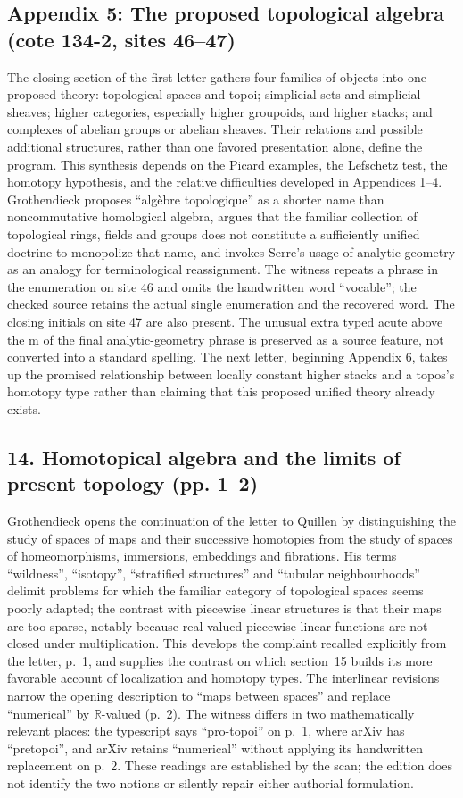 \documentclass[10pt,oneside]{book}
\begin{document}
\subsection*{Appendix 5: The proposed topological algebra (cote 134-2, sites 46--47)}
The closing section of the first letter gathers four families of objects into one proposed theory: topological spaces and topoi; simplicial sets and simplicial sheaves; higher categories, especially higher groupoids, and higher stacks; and complexes of abelian groups or abelian sheaves. Their relations and possible additional structures, rather than one favored presentation alone, define the program. This synthesis depends on the Picard examples, the Lefschetz test, the homotopy hypothesis, and the relative difficulties developed in Appendices 1--4. Grothendieck proposes ``algèbre topologique'' as a shorter name than noncommutative homological algebra, argues that the familiar collection of topological rings, fields and groups does not constitute a sufficiently unified doctrine to monopolize that name, and invokes Serre's usage of analytic geometry as an analogy for terminological reassignment. The witness repeats a phrase in the enumeration on site 46 and omits the handwritten word ``vocable''; the checked source retains the actual single enumeration and the recovered word. The closing initials on site 47 are also present. The unusual extra typed acute above the m of the final analytic-geometry phrase is preserved as a source feature, not converted into a standard spelling. The next letter, beginning Appendix 6, takes up the promised relationship between locally constant higher stacks and a topos's homotopy type rather than claiming that this proposed unified theory already exists.

\subsection*{14. Homotopical algebra and the limits of present topology (pp. 1--2)}
Grothendieck opens the continuation of the letter to Quillen by distinguishing the study of spaces of maps and their successive homotopies from the study of spaces of homeomorphisms, immersions, embeddings and fibrations. His terms ``wildness'', ``isotopy'', ``stratified structures'' and ``tubular neighbourhoods'' delimit problems for which the familiar category of topological spaces seems poorly adapted; the contrast with piecewise linear structures is that their maps are too sparse, notably because real-valued piecewise linear functions are not closed under multiplication. This develops the complaint recalled explicitly from the letter, p.~1, and supplies the contrast on which section~15 builds its more favorable account of localization and homotopy types. The interlinear revisions narrow the opening description to ``maps between spaces'' and replace ``numerical'' by $\mathbb R$-valued (p.~2). The witness differs in two mathematically relevant places: the typescript says ``pro-topoi'' on p.~1, where arXiv has ``pretopoi'', and arXiv retains ``numerical'' without applying its handwritten replacement on p.~2. These readings are established by the scan; the edition does not identify the two notions or silently repair either authorial formulation.
\end{document}
